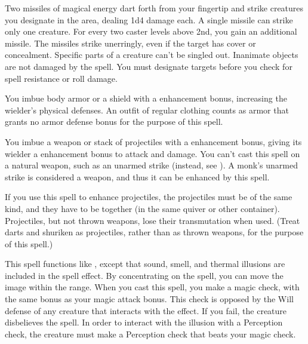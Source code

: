 \spelleffect Two missiles of magical energy dart forth from your fingertip and strike creatures you designate in the area, dealing 1d4 damage each. A single missile can strike only one creature. For every two caster levels above 2nd, you gain an additional missile.
The missiles strike unerringly, even if the target has cover or concealment. Specific parts of a creature can't be singled out. Inanimate objects are not damaged by the spell. You must designate targets before you check for spell resistance or roll damage.

\spelldur{\durmed}
\spelleffect You imbue body armor or a shield with a  enhancement bonus, increasing the wielder's physical defenses. \spellbonusscalingdescription
\spellnotes An outfit of regular clothing counts as armor that grants no armor defense bonus for the purpose of this spell.

\spelldur{\durshort}
\spelleffect You imbue a weapon or stack of projectiles with a  enhancement bonus, giving its wielder a  enhancement bonus to attack and damage. \spellbonusscalingdescription
\spellnotes You can't cast this spell on a natural weapon, such as an unarmed strike (instead, see ). A monk's unarmed strike is considered a weapon, and thus it can be enhanced by this spell.
\par If you use this spell to enhance projectiles, the projectiles must be of the same kind, and they have to be together (in the same quiver or other container). Projectiles, but not thrown weapons, lose their transmutation when used. (Treat darts and shuriken as projectiles, rather than as thrown weapons, for the purpose of this spell.)

\spelleffect This spell functions like , except that sound, smell, and thermal illusions are included in the spell effect. By concentrating on the spell, you can move the image within the range.
\spellnotes When you cast this spell, you make a magic check, with the same bonus as your magic attack bonus. This check is opposed by the Will defense of any creature that interacts with the effect. If you fail, the creature disbelieves the spell. In order to interact with the illusion with a Perception check, the creature must make a Perception check that beats your magic check.


